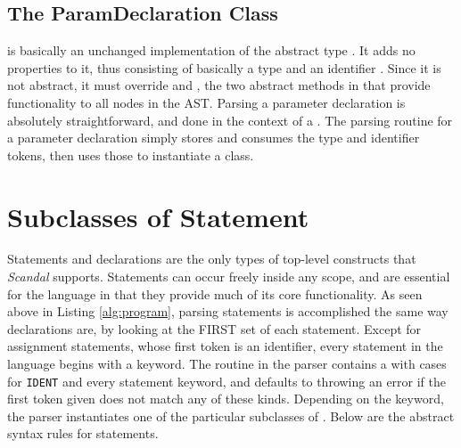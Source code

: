 \subsection{The ParamDeclaration Class}

 is basically an unchanged implementation of the abstract type . It adds no properties to it, thus consisting of basically a type  and an identifier . Since it is not abstract, it must override  and , the two abstract methods in  that provide functionality to all nodes in the AST. Parsing a parameter declaration is absolutely straightforward, and done in the context of a . The parsing routine for a parameter declaration simply stores and consumes the type and identifier tokens, then uses those to instantiate a  class.

\section{Subclasses of Statement}

Statements and declarations are the only types of top-level constructs that \emph{Scandal} supports. Statements can occur freely inside any scope, and are essential for the language in that they provide much of its core functionality. As seen above in Listing \ref{alg:program}, parsing statements is accomplished the same way declarations are, by looking at the FIRST set of each statement. Except for assignment statements, whose first token is an identifier, every statement in the language begins with a keyword. The  routine in the parser contains a  with cases for \texttt{IDENT} and every statement keyword, and defaults to throwing an error if the first token given does not match any of these kinds. Depending on the keyword, the parser instantiates one of the particular subclasses of . Below are the abstract syntax rules for statements.


